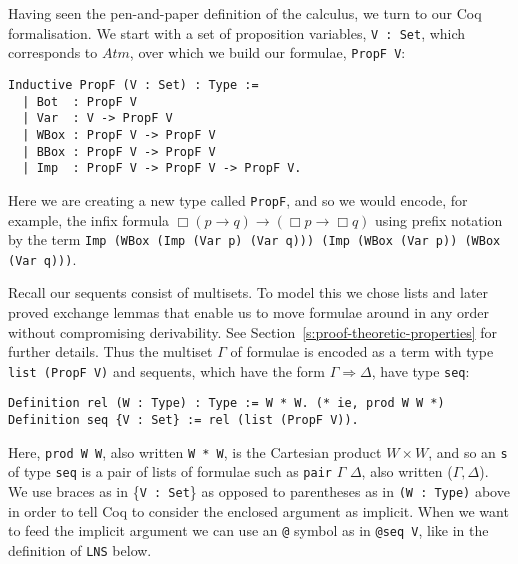 \documentclass[a4paper]{article}
\newcommand{\raj}[1]{\textcolor{blue}{#1}}
\newcommand{\code}{\lstinline[mathescape=true,breaklines=true,basicstyle=\ttfamily\footnotesize]}
\newcommand{\atm}{\textit{Atm}}
\newcommand{\wbx}{\Box}
\newcommand{\sa}{\Rightarrow}
\begin{document}
Having seen the pen-and-paper definition of the calculus, we turn to our Coq formalisation. We start with a set of proposition variables, \code|V : Set|, which corresponds to $\atm$, over which we build our formulae, \code|PropF V|:
\begin{lstlisting}
Inductive PropF (V : Set) : Type :=
  | Bot  : PropF V      
  | Var  : V -> PropF V
  | WBox : PropF V -> PropF V      
  | BBox : PropF V -> PropF V
  | Imp  : PropF V -> PropF V -> PropF V.
\end{lstlisting}

Here we are creating a new type called \code|PropF|, and so we would encode, for example, the infix formula
$\wbx (p \to q) \to (\wbx p \to \wbx q)$ using prefix notation by the term
\code|Imp (WBox (Imp (Var p) (Var q))) (Imp (WBox (Var p)) (WBox (Var q)))|.



Recall our sequents consist of multisets. To model this we chose lists and later proved exchange lemmas that enable us to move formulae around in any order without compromising derivability. See Section~\ref{s:proof-theoretic-properties} for further details. 
Thus the multiset $\Gamma$ of formulae is encoded as a term with type \code|list (PropF V)| and sequents, which have the form $\Gamma\sa\Delta$, have type \code|seq|:
\begin{lstlisting}
Definition rel (W : Type) : Type := W * W. (* ie, prod W W *)
Definition seq {V : Set} := rel (list (PropF V)).
\end{lstlisting}

Here, \code|prod W W|, also written \code|W * W|,
is the Cartesian product $W\times
W$, and so an \code|s| of type \code|seq| is a pair of lists of formulae
such as \code|pair| $\Gamma$ $\Delta$, also written ($\Gamma, \Delta$).
We use braces as in \{\code|V : Set|\}
as opposed to parentheses as in \code|(W : Type)| above in
order to tell Coq to consider the enclosed argument as implicit. When
we want to feed the implicit argument we can use an \code|@| symbol as
in \code|@seq V|, like in the definition of \code|LNS| below.
\end{document}
